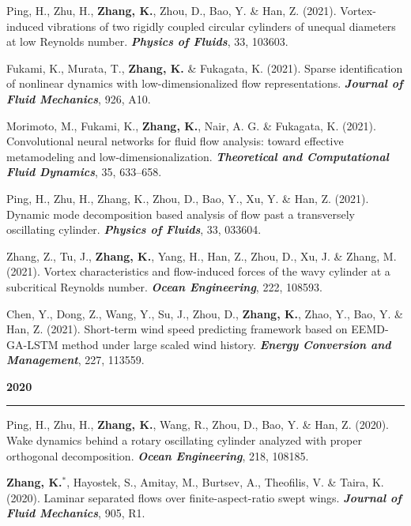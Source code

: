 \documentclass[10pt]{article}
\begin{document}
{\begin{etaremune}
  \item Ping, H., Zhu, H., \textbf{Zhang, K.}, Zhou, D., Bao, Y. \& Han, Z. (2021). Vortex-induced vibrations of two rigidly coupled circular cylinders of unequal diameters at low Reynolds number. \textit{\textbf{Physics of Fluids}}, 33, 103603. 
  
  \item Fukami, K., Murata, T., \textbf{Zhang, K.} \& Fukagata, K. (2021). Sparse identification of nonlinear dynamics with low-dimensionalized flow representations. \textit{\textbf{Journal of Fluid Mechanics}}, 926, A10.
  
  \item Morimoto, M., Fukami, K., \textbf{Zhang, K.}, Nair, A. G. \& Fukagata, K. (2021). Convolutional neural networks for fluid flow analysis: toward effective metamodeling and low-dimensionalization. \textit{\textbf{Theoretical and Computational Fluid Dynamics}}, 35, 633–658.

  \item Ping, H., Zhu, H., Zhang, K., Zhou, D., Bao, Y., Xu, Y. \& Han, Z. (2021). Dynamic mode decomposition based analysis of flow past a transversely oscillating cylinder. \textit{\textbf{Physics of Fluids}}, 33, 033604. 
  
  \item Zhang, Z., Tu, J., \textbf{Zhang, K.}, Yang, H., Han, Z., Zhou, D., Xu, J. \& Zhang, M. (2021). Vortex characteristics and flow-induced forces of the wavy cylinder at a subcritical Reynolds number. \textit{\textbf{Ocean Engineering}}, 222, 108593.
  
  \item Chen, Y., Dong, Z., Wang, Y., Su, J., Zhou, D., \textbf{Zhang, K.}, Zhao, Y., Bao, Y. \& Han, Z. (2021). Short-term wind speed predicting framework based on EEMD-GA-LSTM method under large scaled wind history. \textit{\textbf{Energy Conversion and Management}}, 227, 113559.
  
 \item [] {\bf \color{Blue} 2020 \rule{14.8cm}{0.2mm}} 
 
  \item Ping, H., Zhu, H., \textbf{Zhang, K.}, Wang, R., Zhou, D., Bao, Y. \& Han, Z. (2020). Wake dynamics behind a rotary oscillating cylinder analyzed with proper orthogonal decomposition. \textit{\textbf{Ocean Engineering}}, 218, 108185.
  
  \item \textbf{Zhang, K.}$^*$, Hayostek, S., Amitay, M., Burtsev, A., Theofilis, V. \& Taira, K. (2020). Laminar separated flows over finite-aspect-ratio swept wings. \textit{\textbf{Journal of Fluid Mechanics}}, 905, R1.
  

\end{etaremune}}
\end{document}
